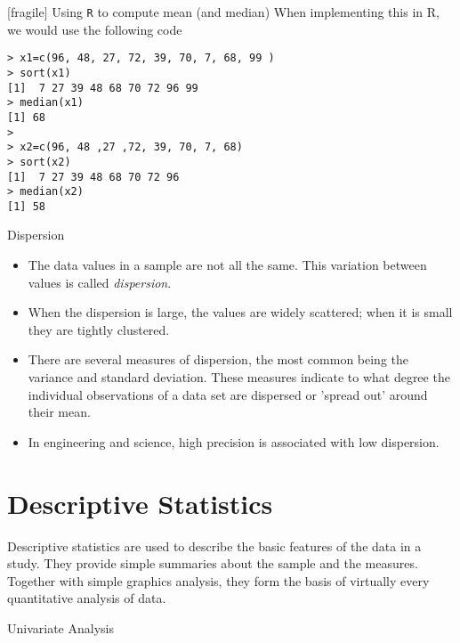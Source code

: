 




[fragile]
	{Using \texttt{R} to compute mean (and median)}
When implementing this in R, we would use the following code

\begin{verbatim}
> x1=c(96, 48, 27, 72, 39, 70, 7, 68, 99 )
> sort(x1)
[1]  7 27 39 48 68 70 72 96 99
> median(x1)
[1] 68
>
> x2=c(96, 48 ,27 ,72, 39, 70, 7, 68)
> sort(x2)
[1]  7 27 39 48 68 70 72 96
> median(x2)
[1] 58
\end{verbatim}


{
	{Dispersion }

\begin{itemize}
\item The data values in a sample are not all the same. This variation between values is called \t{ \emph{dispersion}}.

\item When the dispersion is large, the values are widely scattered; when it is small they are tightly clustered.


\item
There are several measures of dispersion, the most common being the variance and  standard deviation. These measures indicate to what degree the individual observations of a data set are dispersed or 'spread out' around their mean.

\item
In engineering and science, high precision is associated with low dispersion.
\end{itemize}
}



\chapter{Descriptive Statistics}
Descriptive statistics are used to describe the basic features of the data in a study. They provide simple summaries about the sample and the measures. Together with simple graphics analysis, they form the basis of virtually every quantitative analysis of data.



Univariate Analysis

